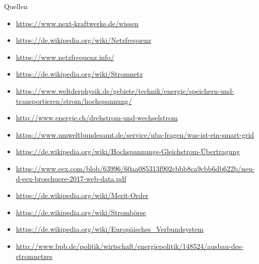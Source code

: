 \documentclass[aspectratio=1610, professionalfonts, 9pt]{beamer}
\begin{document}
\begin{frame}{Quellen}
\begin{itemize}
  \item \url{https://www.next-kraftwerke.de/wissen}
  \item \url{https://de.wikipedia.org/wiki/Netzfrequenz}
  \item \url{https://www.netzfrequenz.info/}
\item \url{https://de.wikipedia.org/wiki/Stromnetz}
\item \url{https://www.weltderphysik.de/gebiete/technik/energie/speichern-und-transportieren/strom/hochspannung/}
\item \url{http://www.energie.ch/drehstrom-und-wechselstrom}
\item \url{https://www.umweltbundesamt.de/service/uba-fragen/was-ist-ein-smart-grid}
\item \url{https://de.wikipedia.org/wiki/Hochspannungs-Gleichstrom-Übertragung}
\item \url{https://www.eex.com/blob/63996/60aa085313f902cbbb8ca9cbb6db622b/neu-d-eex-broschuere-2017-web-data.pdf}
\item \url{https://de.wikipedia.org/wiki/Merit-Order}
\item \url{https://de.wikipedia.org/wiki/Strombörse}
\item \url{https://de.wikipedia.org/wiki/Europäisches_Verbundsystem}
\item \url{http://www.bpb.de/politik/wirtschaft/energiepolitik/148524/ausbau-des-stromnetzes}
\end{itemize}
\end{frame}
\end{document}
